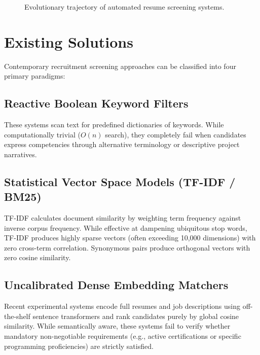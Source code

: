 \documentclass[12pt,a4paper]{report}
\begin{document}
\begin{figure}[h!]
\centering
{}
\caption{Evolutionary trajectory of automated resume screening systems.}
\label{fig:evolution_timeline}
\end{figure}

\section{Existing Solutions}
Contemporary recruitment screening approaches can be classified into four primary paradigms:

\subsection{Reactive Boolean Keyword Filters}
These systems scan text for predefined dictionaries of keywords. While computationally trivial ($O(n)$ search), they completely fail when candidates express competencies through alternative terminology or descriptive project narratives.

\subsection{Statistical Vector Space Models (TF-IDF / BM25)}
TF-IDF calculates document similarity by weighting term frequency against inverse corpus frequency. While effective at dampening ubiquitous stop words, TF-IDF produces highly sparse vectors (often exceeding 10,000 dimensions) with zero cross-term correlation. Synonymous pairs produce orthogonal vectors with zero cosine similarity.

\subsection{Uncalibrated Dense Embedding Matchers}
Recent experimental systems encode full resumes and job descriptions using off-the-shelf sentence transformers and rank candidates purely by global cosine similarity. While semantically aware, these systems fail to verify whether mandatory non-negotiable requirements (e.g., active certifications or specific programming proficiencies) are strictly satisfied.
\end{document}
